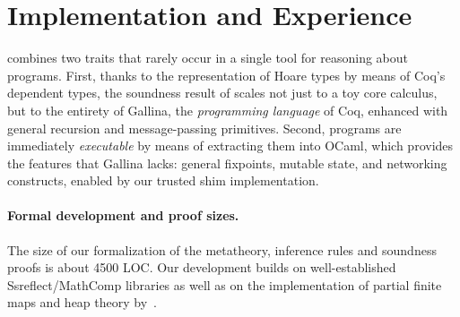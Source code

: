 \section{Implementation and Experience}
\label{sec:eval-impl}

\disel combines two traits that rarely occur in a single tool for
reasoning about programs.  First, thanks to the representation of Hoare
types by means of Coq's dependent types, the soundness result of
\disel scales not just to a toy core calculus, but to the entirety of
Gallina, the \emph{programming language} of Coq, enhanced with general
recursion and message-passing primitives.
%
Second, \disel programs are immediately \emph{executable} by means of
extracting them into OCaml, which provides the features that Gallina
lacks: general fixpoints, mutable state, and networking constructs,
enabled by our trusted shim implementation.


\paragraph{Formal development and proof sizes.~}
%
The size of our formalization of the metatheory, inference rules and
soundness proofs is about 4500 LOC.  Our development builds on
well-established {Ssreflect}/MathComp libraries
\cite{Gonthier-al:TR,Maboubi-Tassi:MathComp,Sergey:PnP} as well as on
the implementation of partial finite maps and heap theory
by~\citet{Nanevski-al:POPL10}.

